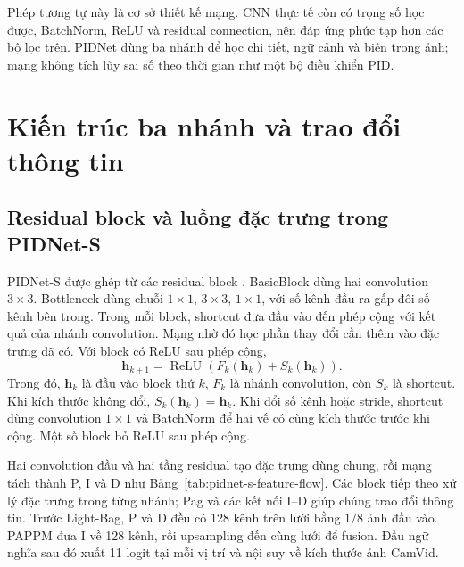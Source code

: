 Phép tương tự này là cơ sở thiết kế mạng. CNN thực tế còn có trọng số học được, BatchNorm, ReLU và residual connection, nên đáp ứng phức tạp hơn các bộ lọc trên. PIDNet dùng ba nhánh để học chi tiết, ngữ cảnh và biên trong ảnh; mạng không tích lũy sai số theo thời gian như một bộ điều khiển PID.

\section{Kiến trúc ba nhánh và trao đổi thông tin}
\subsection{Residual block và luồng đặc trưng trong PIDNet-S}
PIDNet-S được ghép từ các residual block \cite{pidnet,pidnetcode}. BasicBlock dùng hai convolution $3\times3$. Bottleneck dùng chuỗi $1\times1$, $3\times3$, $1\times1$, với số kênh đầu ra gấp đôi số kênh bên trong. Trong mỗi block, shortcut đưa đầu vào đến phép cộng với kết quả của nhánh convolution. Mạng nhờ đó học phần thay đổi cần thêm vào đặc trưng đã có. Với block có ReLU sau phép cộng,
\begin{equation}
 \mathbf h_{k+1}=\operatorname{ReLU}\!\left(F_k(\mathbf h_k)+S_k(\mathbf h_k)\right).
 \label{eq:residual-block}
\end{equation}
Trong đó, $\mathbf h_k$ là đầu vào block thứ $k$, $F_k$ là nhánh convolution, còn $S_k$ là shortcut. Khi kích thước không đổi, $S_k(\mathbf h_k)=\mathbf h_k$. Khi đổi số kênh hoặc stride, shortcut dùng convolution $1\times1$ và BatchNorm để hai vế có cùng kích thước trước khi cộng. Một số block bỏ ReLU sau phép cộng.

Hai convolution đầu và hai tầng residual tạo đặc trưng dùng chung, rồi mạng tách thành P, I và D như Bảng~\ref{tab:pidnet-s-feature-flow}. Các block tiếp theo xử lý đặc trưng trong từng nhánh; Pag và các kết nối I--D giúp chúng trao đổi thông tin. Trước Light-Bag, P và D đều có 128 kênh trên lưới bằng $1/8$ ảnh đầu vào. PAPPM đưa I về 128 kênh, rồi upsampling đến cùng lưới để fusion. Đầu ngữ nghĩa sau đó xuất 11 logit tại mỗi vị trí và nội suy về kích thước ảnh CamVid.

